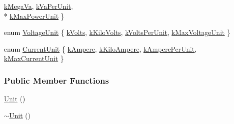 \begin{DoxyCompactItemize}
\hyperlink{class_unit_ace265ae255370ccacfd5370337572c3ba6039da0ed20f8bee64305bab8bdec365}{k\+Mega\+Va}, 
\hyperlink{class_unit_ace265ae255370ccacfd5370337572c3bae056e80d620a87c61a44c359e6b05cc1}{k\+Va\+Per\+Unit}, 
\\*
\hyperlink{class_unit_ace265ae255370ccacfd5370337572c3ba99900819ad721f8dc4dd2001f51ef9b7}{k\+Max\+Power\+Unit}
 \}
\item 
enum \hyperlink{class_unit_a55b07dfa9457e1eca2c7194fe0cfc3c1}{Voltage\+Unit} \{ \hyperlink{class_unit_a55b07dfa9457e1eca2c7194fe0cfc3c1aa54b2473993a702a3923525765bd6e4c}{k\+Volts}, 
\hyperlink{class_unit_a55b07dfa9457e1eca2c7194fe0cfc3c1a35a201a658c2cd89766787c657e9a54d}{k\+Kilo\+Volts}, 
\hyperlink{class_unit_a55b07dfa9457e1eca2c7194fe0cfc3c1ab44b1310b59fdcdc9df5bbea91da4206}{k\+Volts\+Per\+Unit}, 
\hyperlink{class_unit_a55b07dfa9457e1eca2c7194fe0cfc3c1acd70db01fb079b3dada6c527cf0407d0}{k\+Max\+Voltage\+Unit}
 \}
\item 
enum \hyperlink{class_unit_a0794cf6c9682f48296dd4a5315389787}{Current\+Unit} \{ \hyperlink{class_unit_a0794cf6c9682f48296dd4a5315389787a368a3c470f0b590a6100dda717a7dd4f}{k\+Ampere}, 
\hyperlink{class_unit_a0794cf6c9682f48296dd4a5315389787aa27cb5edd73099f24f2285e02396ae14}{k\+Kilo\+Ampere}, 
\hyperlink{class_unit_a0794cf6c9682f48296dd4a5315389787aeed3b50e464d581cb630181a3b6a0709}{k\+Ampere\+Per\+Unit}, 
\hyperlink{class_unit_a0794cf6c9682f48296dd4a5315389787aeb1fd2a24bcda443e3c3d91c525134c8}{k\+Max\+Current\+Unit}
 \}
\end{DoxyCompactItemize}
\subsubsection*{Public Member Functions}
\begin{DoxyCompactItemize}
\item 
\hyperlink{class_unit_a8e46f663a95736c8002d85ab271a7581}{Unit} ()
\item 
\hyperlink{class_unit_a6353fc4c0a329997ad4abcf0dcb4eb27}{$\sim$\+Unit} ()
\end{DoxyCompactItemize}
